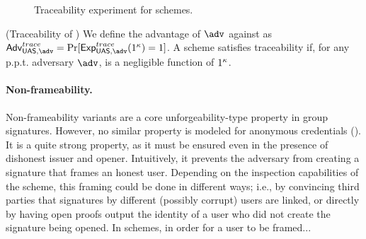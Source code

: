 \begin{figure}[htp!]
  \caption{Traceability experiment for \GSAC schemes.}
  \label{fig:exp-gsac-trace}
\end{figure}

\begin{definition}{(Traceability of \GSAC)}
  We define the advantage \AdvTrace of $\adv$ against \ExpTrace as
  $\AdvTrace=\Pr\lbrack\ExpTrace(1^\secpar)=1\rbrack$.
  A \GSAC scheme satisfies traceability if, for any p.p.t. adversary $\adv$,
  \AdvTrace is a negligible function of $1^\kappa$.
\end{definition}

\paragraph{Non-frameability.} %
Non-frameability variants are a core unforgeability-type property in group
signatures. However, no
similar property is modeled for anonymous credentials (). It is a quite strong
property, as it must be ensured even in the presence of dishonest issuer and
opener. Intuitively, it prevents the adversary from creating a signature that
frames an honest user. Depending on the inspection capabilities of the scheme,
this framing could be done in different ways; i.e., by convincing third parties
that signatures by different (possibly corrupt) users are linked, or directly
by having open proofs output the identity of a user who did not create the
signature being opened.
%
In \UAS schemes, in order for a user to be framed...

